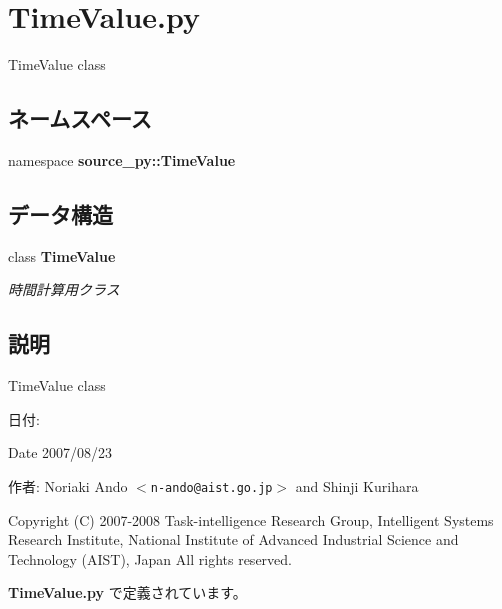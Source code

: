 \section{TimeValue.py}
\label{_time_value_8py}
TimeValue class 

\subsection*{ネームスペース}
\begin{CompactItemize}
\item 
namespace \textbf{source\_\-py::TimeValue}
\end{CompactItemize}
\subsection*{データ構造}
\begin{CompactItemize}
\item 
class {\bf TimeValue}
\begin{CompactList}\small\item\em 時間計算用クラス \item\end{CompactList}\end{CompactItemize}


\subsection{説明}
TimeValue class 

\begin{Desc}
\item[日付:]\end{Desc}
\begin{Desc}
\item[Date]2007/08/23\end{Desc}
\begin{Desc}
\item[作者:]Noriaki Ando $<${\tt n-ando@aist.go.jp}$>$ and Shinji Kurihara\end{Desc}
Copyright (C) 2007-2008 Task-intelligence Research Group, Intelligent Systems Research Institute, National Institute of Advanced Industrial Science and Technology (AIST), Japan All rights reserved. 

 {\bf TimeValue.py} で定義されています。